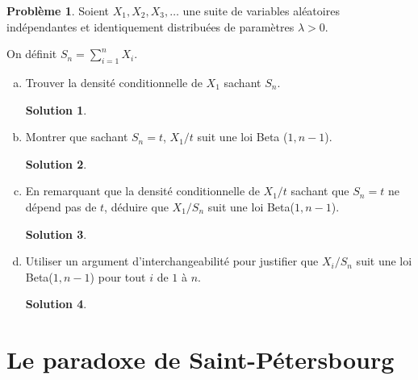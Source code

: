 \documentclass[11pt]{amsart}
\theoremstyle{definition}
\newtheorem{probleme}{Problème}
\newtheorem*{solution}{Solution}
\theoremstyle{remark}
\numberwithin{equation}{section}
\newcommand \1 {\mathbbm 1}
\begin{document}
	\begin{probleme}
		Soient $X_1, X_2, X_3, \dots$ une suite de variables aléatoires indépendantes
		et identiquement distribuées de paramètres $\lambda > 0$.
		
		On définit $S_n = \sum_{i=1}^n X_i$.
		
		\begin{enumerate}[(a)]
			\item Trouver la densité conditionnelle
			de $X_1$ sachant $S_n$.
		
		\begin{solution}
		\end{solution}
		\vspace{0.3cm}
		
			
			\item Montrer que sachant $S_n = t$, $X_1/t$ suit une loi Beta ($1,n-1$).
		
		\begin{solution}
		\end{solution}
		\vspace{0.3cm}
		
			
			\item En remarquant que la densité conditionnelle de $X_1/t$ sachant que $S_n= t$ ne dépend pas de $t$, déduire que $X_1/S_n$ suit une loi Beta($1, n-1$).
		
		\begin{solution}
		\end{solution}
		\vspace{0.3cm}
		
			
			\item Utiliser un argument d'interchangeabilité pour justifier que
			$X_i/S_n$ suit une loi Beta($1, n-1$) pour tout $i$ de $1$ à $n$.
		
		\begin{solution}
		\end{solution}
		\vspace{0.3cm}
		
			
			
			\end{enumerate}
	\end{probleme}
		
	\newpage
	
	\section{Le paradoxe de Saint-Pétersbourg}
	
\end{document}
